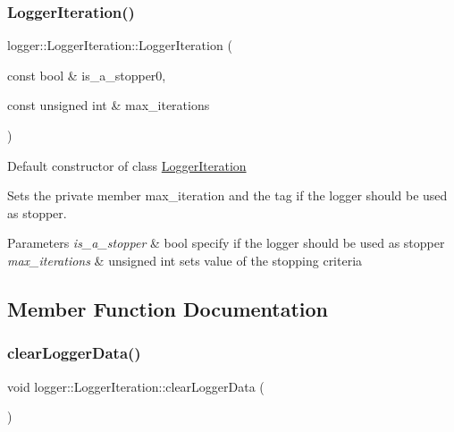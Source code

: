 \subsubsection{\texorpdfstring{Logger\+Iteration()}{LoggerIteration()}}
{\footnotesize\ttfamily logger\+::\+Logger\+Iteration\+::\+Logger\+Iteration (\begin{DoxyParamCaption}\item[{const bool \&}]{is\+\_\+a\+\_\+stopper0,  }\item[{const unsigned int \&}]{max\+\_\+iterations }\end{DoxyParamCaption})}



Default constructor of class {\ttfamily \hyperlink{classlogger_1_1_logger_iteration}{Logger\+Iteration}} 

Sets the private member {\ttfamily max\+\_\+iteration} and the tag if the logger should be used as stopper.


\begin{DoxyParams}{Parameters}
{\em is\+\_\+a\+\_\+stopper} & {\ttfamily bool} specify if the logger should be used as stopper \\
\hline
{\em max\+\_\+iterations} & {\ttfamily unsigned int} sets value of the stopping criteria \\
\hline
\end{DoxyParams}


\subsection{Member Function Documentation}
\mbox{\label{classlogger_1_1_logger_iteration_ac7c2aace3ba5f22d8f42ec078fe62602}} 
\subsubsection{\texorpdfstring{clear\+Logger\+Data()}{clearLoggerData()}}
{\footnotesize\ttfamily void logger\+::\+Logger\+Iteration\+::clear\+Logger\+Data (\begin{DoxyParamCaption}{ }\end{DoxyParamCaption})\hspace{0.3cm}{\ttfamily [virtual]}}



